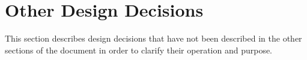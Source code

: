 \section{Other Design Decisions}
This section describes design decisions that have not been described in the other sections of the document in order to clarify their operation and purpose.



